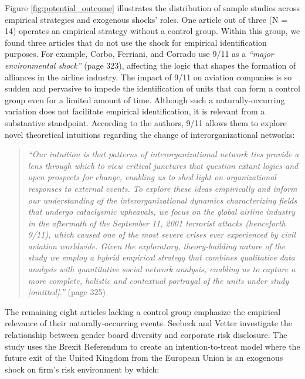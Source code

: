 \documentclass[11pt]{article}
\begin{document}
\begin{refsection}
Figure \ref{fig:potential_outcome} illustrates the distribution of sample
studies across empirical strategies and exogenous shocks' roles. One article 
out of three (N = 14) operates an empirical strategy without a control group.
Within this group, we found three articles that do not use the shock for
empirical identification purposes. For example, Corbo, Ferriani, and Corrado
\autocite*{corbo2016323} use 9/11 as a \textit{``major environmental shock''}
(page 323), affecting the logic that shapes the formation of alliances in the
airline industry. The impact of 9/11 on aviation companies is so sudden and
pervasive to impede the identification of units that can form a control group
even for a limited amount of time.  Although such a naturally-occurring
variation does not facilitate empirical identification, it is relevant from a
substantive standpoint. According to the authors, 9/11 allows them to explore
novel theoretical intuitions regarding the change of interorganizational
networks:

\begin{quote}
  \textit{
    ``Our intuition is that patterns of interorganizational network ties
provide
    a lens through which to view critical junctures that question extant logics
    and open prospects for change, enabling us to shed light on organizational
    responses to external events.  To explore these ideas empirically and
inform
    our understanding of the interorganizational dynamics characterizing fields
    that undergo cataclysmic upheavals, we focus on the global airline industry
    in the aftermath of the September 11, 2001 terrorist attacks (henceforth
    9/11), which caused one of the most severe crises ever experienced by civil
    aviation worldwide. Given the exploratory, theory-building nature of the
    study we employ a hybrid empirical strategy that combines qualitative data
    analysis with quantitative social network analysis, enabling us to capture
a
    more complete, holistic and contextual portrayal of the units under study
    [omitted].''
  }
  (page 325)
\end{quote}

The remaining eight articles lacking a control group emphasize the empirical
relevance of their naturally-occurring events. Seebeck and Vetter
\autocite*{seebeck2021} investigate the relationship between gender board
diversity and corporate risk disclosure.  The study uses the Brexit Referendum
to create an intention-to-treat model where the future exit of the United
Kingdom from the European Union is an exogenous shock on firm's risk
environment
by which:


\end{refsection}
\end{document}
